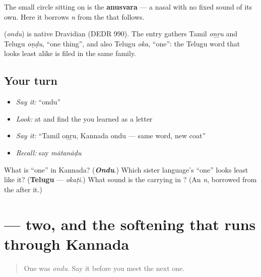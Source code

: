 The small circle \textbf{} sitting on  is the \textbf{anusvara} — a nasal with no fixed sound of its own. Here it borrows \emph{n} from the \textbf{} that follows.

\begin{cousinweb}
\textbf{} (\emph{ondu}) is native Dravidian (DEDR 990). The entry gathers Tamil \emph{oṉṟu} and Telugu \emph{oṇḍu}, \textquotedblleft{}one thing\textquotedblright{}, and also Telugu \emph{oka}, \textquotedblleft{}one\textquotedblright{}: the Telugu word that looks least alike is filed in the same family.
\end{cousinweb}

\subsection*{Your turn}
\begin{itemize}
\raggedright
  \item \emph{Say it:} \textquotedblleft{}ondu\textquotedblright{}
  \item \emph{Look:} at  and find the  you learned as a letter
  \item \emph{Say it:} \textquotedblleft{}Tamil oṉṟu, Kannada ondu — same word, new coat\textquotedblright{}
  \item \emph{Recall:} say \emph{mātanāḍu}
\end{itemize}

\begin{tcolorbox}[breakable,colback=teal!4,colframe=teal!35!black,title={Before you move on}]
What is \textquotedblleft{}one\textquotedblright{} in Kannada? (\emph{\textbf{Ondu}}.) Which sister language's \textquotedblleft{}one\textquotedblright{} looks least like it? (\textbf{Telugu} — \emph{okaṭi}.) What sound is the  carrying in ? (An \emph{n}, borrowed from the  after it.)
\end{tcolorbox}
\section[\texorpdfstring{\kn{ಎರಡು} (eraḍu)}{ಎರಡು (eraḍu)}]{ — two, and the softening that runs through Kannada}

\label{lesson:KA-C07-eradu}



\begin{quote}
One was \emph{ondu}. Say it before you meet the next one.
\end{quote}

